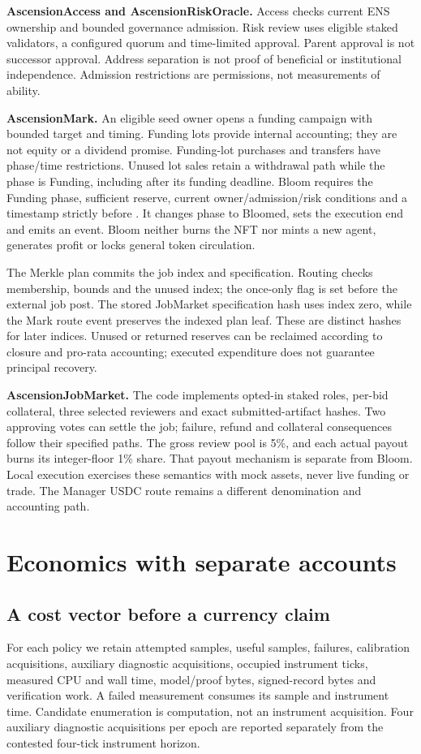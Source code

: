 \textbf{AscensionAccess and AscensionRiskOracle.} Access checks current ENS ownership and bounded governance admission. Risk review uses eligible staked validators, a configured quorum and time-limited approval. Parent approval is not successor approval. Address separation is not proof of beneficial or institutional independence. Admission restrictions are permissions, not measurements of ability.

\textbf{AscensionMark.} An eligible seed owner opens a funding campaign with bounded target and timing. Funding lots provide internal accounting; they are not equity or a dividend promise. Funding-lot purchases and transfers have phase/time restrictions. Unused lot sales retain a withdrawal path while the phase is Funding, including after its funding deadline. Bloom requires the Funding phase, sufficient reserve, current owner/admission/risk conditions and a timestamp strictly before . It changes phase to Bloomed, sets the execution end and emits an event. Bloom neither burns the NFT nor mints a new agent, generates profit or locks general token circulation.

The Merkle plan commits the job index and specification. Routing checks membership, bounds and the unused index; the once-only flag is set before the external job post. The stored JobMarket specification hash uses index zero, while the Mark route event preserves the indexed plan leaf. These are distinct hashes for later indices. Unused or returned reserves can be reclaimed according to closure and pro-rata accounting; executed expenditure does not guarantee principal recovery.

\textbf{AscensionJobMarket.} The code implements opted-in staked roles, per-bid collateral, three selected reviewers and exact submitted-artifact hashes. Two approving votes can settle the job; failure, refund and collateral consequences follow their specified paths. The gross review pool is 5\%, and each actual payout burns its integer-floor 1\% share. That payout mechanism is separate from Bloom. Local execution exercises these semantics with mock assets, never live funding or trade. The Manager USDC route remains a different denomination and accounting path.

\section{Economics with separate accounts}
\subsection{A cost vector before a currency claim}
For each policy we retain attempted samples, useful samples, failures, calibration acquisitions, auxiliary diagnostic acquisitions, occupied instrument ticks, measured CPU and wall time, model/proof bytes, signed-record bytes and verification work. A failed measurement consumes its sample and instrument time. Candidate enumeration is computation, not an instrument acquisition. Four auxiliary diagnostic acquisitions per epoch are reported separately from the contested four-tick instrument horizon.


